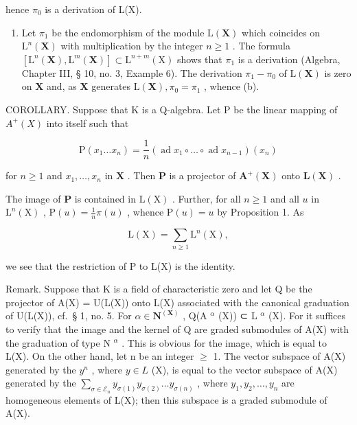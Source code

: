 hence \(\pi_0\) is a derivation of L(X).

\begin{enumerate}
\def\labelenumi{(\alph{enumi})}
\setcounter{enumi}{1}
\tightlist
\item
  Let \(\pi_1\) be the endomorphism of the module \(\mathrm{L}(\mathbf{X})\) which coincides on \(\mathrm{L}^n (\mathbf{X})\) with multiplication by the integer \(n\geqslant 1\) . The formula \([\mathrm{L}^n (\mathbf{X}),\mathrm{L}^m (\mathbf{X})]\subset \mathrm{L}^{n + m}(\mathrm{X})\) shows that \(\pi_{1}\) is a derivation (Algebra, Chapter III, § 10, no. 3, Example 6). The derivation \(\pi_1 - \pi_0\) of \(\mathrm{L}(\mathbf{X})\) is zero on \(\mathbf{X}\) and, as \(\mathbf{X}\) generates \(\mathrm{L}(\mathbf{X}),\pi_0 = \pi_1\) , whence (b).
\end{enumerate}

COROLLARY. Suppose that K is a Q-algebra. Let P be the linear mapping of \(A^{+}(X)\) into itself such that

\[
\mathrm{P} \left(x _ {1} \dots x _ {n}\right) = \frac {1}{n} (\operatorname{ad} x _ {1} \circ \dots \circ \operatorname{ad} x _ {n - 1}) (x _ {n})\tag{6}
\]

for \(n \geqslant 1\) and \(x_1, \ldots, x_n\) in \(\mathbf{X}\) . Then \(\mathbf{P}\) is a projector of \(\mathbf{A}^+(\mathbf{X})\) onto \(\mathbf{L}(\mathbf{X})\) .

The image of \(\mathbf{P}\) is contained in \(\mathrm{L}(\mathrm{X})\) . Further, for all \(n \geqslant 1\) and all \(u\) in \(\mathrm{L}^n (\mathrm{X})\) , \(\mathrm{P}(u) = \frac{1}{n}\pi (u)\) , whence \(\mathrm{P}(u) = u\) by Proposition 1. As

\[
\mathrm{L} (\mathrm{X}) = \sum_ {n \geqslant 1} \mathrm{L} ^ {n} (\mathrm{X}),
\]

we see that the restriction of P to L(X) is the identity.

Remark. Suppose that K is a field of characteristic zero and let Q be the projector of A(X) = U(L(X)) onto L(X) associated with the canonical graduation of U(L(X)), cf.~§ 1, no. 5. For \(\alpha \in \mathbf{N}^{(\mathbf{X})}\) , Q(A \(^\alpha\) (X)) ⊂ L \(^\alpha\) (X). For it suffices to verify that the image and the kernel of Q are graded submodules of A(X) with the graduation of type N \(^\alpha\) . This is obvious for the image, which is equal to L(X). On the other hand, let n be an integer \(\geqslant\) 1. The vector subspace of A(X) generated by the \(y^n\) , where \(y \in L\) (X), is equal to the vector subspace of A(X) generated by the \(\sum_{\sigma \in \mathcal{E}_n} y_{\sigma(1)} y_{\sigma(2)} \ldots y_{\sigma(n)}\) , where \(y_1, y_2, \ldots, y_n\) are homogeneous elements of L(X); then this subspace is a graded submodule of A(X).

